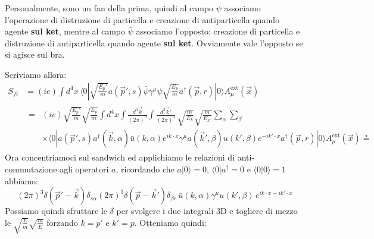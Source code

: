 \documentclass[../main.tex]{subfiles}
\begin{document}
\begin{enumerate}
\begin{nota}
        Personalmente, sono un fan della prima, quindi al campo $\psi$ associamo l'operazione di distruzione di particella e creazione di antiparticella quando agente \textbf{sul ket}, mentre al campo $\bar\psi$ associamo l'opposto: creazione di particella e distruzione di antiparticella quando agente \textbf{sul ket}. Ovviamente vale l'opposto se si agisce sul bra.
        \label{note:creation_destruction_convention}
    \end{nota}

    Scriviamo allora:
    \[
    \begin{aligned}
    S_{fi} &= (ie)\int d^4x\, \langle 0|\sqrt{\frac{E_p'}{m}} a(\Vec p',s) \bar\psi\gamma^\mu \psi \sqrt{\frac{E_p}{m}} a^\dagger(\Vec p,r)|0\rangle A^\text{ext}_\mu(\Vec x) \\
    & 
        \begin{aligned}
            =&(ie)\sqrt{\frac{E_p'}{m}}\sqrt{\frac{E_p}{m}}\int d^4x\int \frac{d^3\Vec k}{(2\pi)^3}\int \frac{d^3\Vec k'}{(2\pi)^3}\,\sqrt{\frac{m}{E_k}}\sqrt{\frac{m}{E_{k'}}} \sum_\alpha\sum_\beta\\
            &\times \langle 0| a(\Vec p',s)a^\dagger(\Vec k,\alpha)\bar u( k,\alpha)e^{ik\cdot x} \gamma^\mu a(\Vec k',\beta) u( k',\beta)e^{-ik'\cdot x} a^\dagger(\Vec p,r)|0\rangle A^\text{ext}_\mu(\Vec x) \overset{\star}{=}
        \end{aligned}
    \end{aligned}
    \]
    Ora concentriamoci sul sandwich ed applichiamo le relazioni di anti-commutazione agli operatori $a$, ricordando che $a|0\rangle = 0$, $\langle 0 | a^\dagger =0$ e $\langle 0|0\rangle = 1$ abbiamo:
    \[
    (2\pi)^3\delta(\Vec p' - \Vec k)\delta_{s\alpha}(2\pi)^3\delta(\Vec p - \Vec k')\delta_{\beta r} \, \bar u( k,\alpha) \gamma^\mu u( k',\beta) \,e^{ik\cdot x-ik'\cdot x}
    \]
    Possiamo quindi sfruttare le $\delta$ per svolgere i due integrali 3D e togliere di mezzo le \(\sqrt{\frac{E}{m}}\sqrt{\frac{m}{E}}\) forzando $k = p'$ e $k'=p$. Otteniamo quindi:


\end{enumerate}
\end{document}
